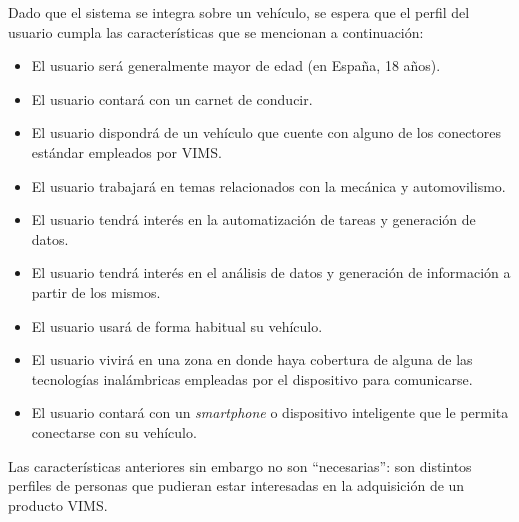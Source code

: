 Dado que el sistema se integra sobre un vehículo, se espera que el perfil del
usuario cumpla las características que se mencionan a continuación:

\begin{itemize}
  \item El usuario será generalmente mayor de edad (en España, 18 años).
  \item El usuario contará con un carnet de conducir.
  \item El usuario dispondrá de un vehículo que cuente con alguno de los 
        conectores estándar empleados por \ac{VIMS}.
  \item El usuario trabajará en temas relacionados con la mecánica y automovilismo.
  \item El usuario tendrá interés en la automatización de tareas y generación de
        datos.
  \item El usuario tendrá interés en el análisis de datos y generación de información
        a partir de los mismos.
  \item El usuario usará de forma habitual su vehículo.
  \item El usuario vivirá en una zona en donde haya cobertura
        de alguna de las tecnologías inalámbricas empleadas por el dispositivo para comunicarse.
  \item El usuario contará con un \textit{smartphone} o dispositivo inteligente que
        le permita conectarse con su vehículo.
\end{itemize}

Las características anteriores sin embargo no son ``necesarias'': son distintos
perfiles de personas que pudieran estar interesadas en la adquisición de un
producto \ac{VIMS}.